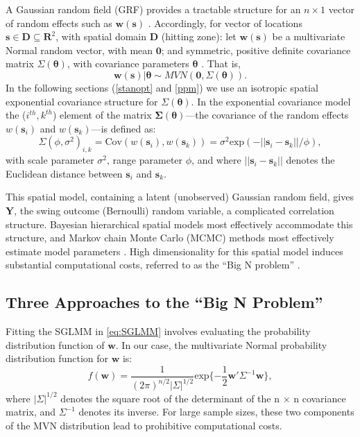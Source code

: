 A Gaussian random field (GRF) provides a tractable structure for an $n \times 1$ vector of random effects such as $\pmb{w}(\pmb{s})$ \citep{Gelfand2010}. Accordingly, for vector of locations $\pmb{s} \in \pmb{D} \subseteq \pmb{R}^{2}$, with spatial domain $\pmb{D}$ (hitting zone): let $\pmb{w}(\pmb{s})$ be a multivariate Normal random vector, with mean $\pmb{0}$; and symmetric, positive definite covariance matrix $\Sigma(\pmb{\theta})$, with covariance parameters $\pmb{\theta}$ \citep{Haran2011}. That is,
\begin{equation} \label{eq:w}
\pmb{w}(\pmb{s}) | \pmb{\theta} \sim MVN(\pmb{0}, \Sigma(\pmb{\theta})). 
\end{equation}
In the following sections (\ref{stanopt} and \ref{ppm}) we use an isotropic spatial exponential covariance structure for $\Sigma(\pmb{\theta})$. In the exponential covariance model the ($i^{th},k^{th}$) element of the matrix $\pmb{\Sigma}(\pmb{\theta})$---the covariance of the random effects $w(\pmb{s}_{i})$ and $w(\pmb{s}_{k})$---is defined as:
\begin{equation} \label{eq:exp}
\Sigma(\phi, \sigma^{2})_{i,k} = \text{Cov}(w(\pmb{s}_{i}), w(\pmb{s}_{k})) =  \sigma^{2} \text{exp}(-||\pmb{s}_{i} - \pmb{s}_{k}||/\phi),
\end{equation}
with scale parameter $\sigma^{2}$, range parameter $\phi$, and where $||\pmb{s}_{i} - \pmb{s}_{k}||$ denotes the Euclidean distance between $\pmb{s}_{i}$ and $\pmb{s}_{k}$.

This spatial model, containing a latent (unobserved) Gaussian random field, gives $\pmb{Y}$, the swing outcome (Bernoulli) random variable, a complicated correlation structure. Bayesian hierarchical spatial models most effectively accommodate this structure, and Markov chain Monte Carlo (MCMC) methods most effectively estimate model parameters \citep{Banerjee2014}. High dimensionality for this spatial model induces substantial computational costs, referred to as the ``Big N problem'' \citep{Lindgren2011}.

\subsection{Three Approaches to the ``Big N Problem''}

Fitting the SGLMM in \ref{eq:SGLMM} involves evaluating the probability distribution function of $\pmb{w}$. In our case, the multivariate Normal probability distribution function for $\pmb{w}$ is:
\begin{equation} \label{eq:mvn}
f(\pmb{w}) = \frac{1}{(2\pi)^{n/2}|\Sigma|^{1/2}} \text{exp}\{ -\frac{1}{2}\pmb{w}'\Sigma^{-1}\pmb{w} \},
\end{equation}
where $|\Sigma|^{1/2}$ denotes the square root of the determinant of the n $\times$ n covariance matrix, and $\Sigma^{-1}$ denotes its inverse. For large sample sizes, these two components of the MVN distribution lead to prohibitive computational costs.

